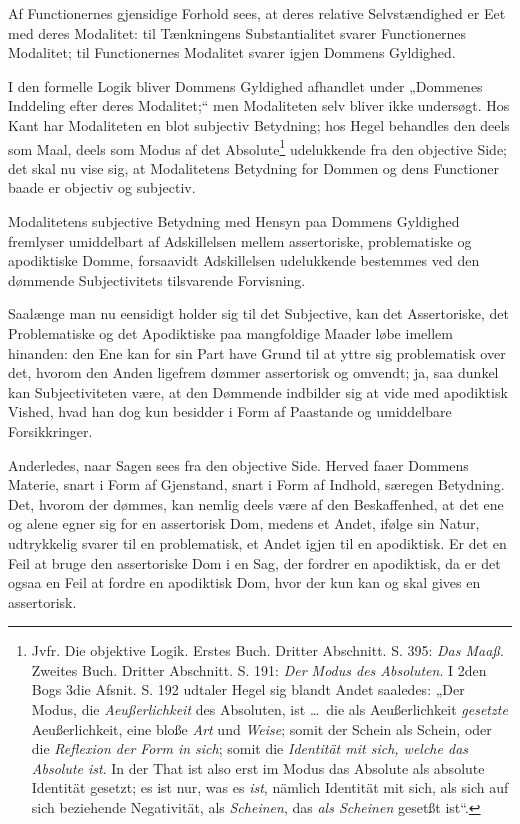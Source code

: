 \documentclass[12pt]{book}
\newcommand{\opage}[1]{\marginnote{\footnotesize\textit{[#1]}}}
\begin{document}
Af Functionernes gjensidige Forhold sees, at deres relative
Selvstændighed er Eet med deres Modalitet: til Tænkningens
Substantialitet svarer Functionernes Modalitet; til
Functionernes Modalitet svarer igjen Dommens Gyldighed.

I den formelle Logik bliver Dommens Gyldighed afhandlet
under „Dommenes Inddeling efter deres Modalitet;“
men Modaliteten selv bliver ikke undersøgt. Hos Kant har
Modaliteten en blot subjectiv Betydning; hos Hegel behandles
den deels som Maal, deels som Modus af det Absolute\footnote{Jvfr. Die objektive Logik. Erstes Buch. Dritter Abschnitt. S. 395:
\emph{Das Maaß}. Zweites Buch. Dritter Abschnitt. S. 191: \emph{Der
Modus des Absoluten}. I 2den Bogs 3die Afsnit. S. 192
udtaler Hegel sig blandt Andet saaledes: „Der Modus, die
\emph{Aeußerlichkeit} des Absoluten, ist \dots\ die als Aeußerlichkeit \emph{gesetzte}
Aeußerlichkeit, eine bloße \emph{Art} und \emph{Weise}; somit der Schein
als Schein, oder die \emph{Reflexion der Form in sich}; somit die
\emph{Identität mit sich, welche das Absolute ist}. In der
That ist also erst im Modus das Absolute als absolute Identität
gesetzt; es ist nur, was es \emph{ist}, nämlich Identität mit sich, als sich
auf sich beziehende Negativität, als \emph{Scheinen}, das \emph{als Scheinen}
gesetßt ist“.} %
udelukkende fra den objective Side; det skal nu vise
sig, at Modalitetens Betydning for Dommen og dens Functioner
baade er objectiv og subjectiv.

Modalitetens subjective Betydning med Hensyn paa
Dommens Gyldighed fremlyser umiddelbart af Adskillelsen
mellem assertoriske, problematiske og apodiktiske Domme, forsaavidt
Adskillelsen udelukkende bestemmes ved den dømmende
Subjectivitets tilsvarende Forvisning.

Saalænge man nu eensidigt holder sig til det Subjective,
kan det Assertoriske, det Problematiske og det Apodiktiske paa
mangfoldige Maader løbe imellem hinanden: den Ene kan for sin
\opage{179}Part have Grund til at yttre sig problematisk over det, hvorom
den Anden ligefrem dømmer assertorisk og omvendt; ja, saa
dunkel kan Subjectiviteten være, at den Dømmende indbilder
sig at vide med apodiktisk Vished, hvad han dog kun besidder
i Form af Paastande og umiddelbare Forsikkringer.

Anderledes, naar Sagen sees fra den objective Side.
Herved faaer Dommens Materie, snart i Form af Gjenstand,
snart i Form af Indhold, særegen Betydning. Det, hvorom
der dømmes, kan nemlig deels være af den Beskaffenhed, at
det ene og alene egner sig for en assertorisk Dom, medens et
Andet, ifølge sin Natur, udtrykkelig svarer til en problematisk,
et Andet igjen til en apodiktisk. Er det en Feil at bruge den
assertoriske Dom i en Sag, der fordrer en apodiktisk, da er
det ogsaa en Feil at fordre en apodiktisk Dom, hvor der kun
kan og skal gives en assertorisk.
\end{document}

